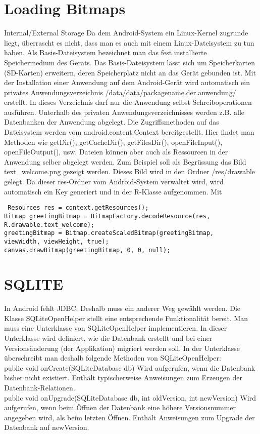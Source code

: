\documentclass[a4paper,10pt,titlepage=false]{scrreprt}
\begin{document}
\section{Loading Bitmaps}
Internal/External Storage
Da dem Android-System ein Linux-Kernel zugrunde liegt, überrascht es nicht, dass man es auch mit
einem Linux-Dateisystem zu tun haben. Als Basis-Dateisystem bezeichnet man das fest installierte
Speichermedium des Geräts. Das Basis-Dateisystem lässt sich um Speicherkarten (SD-Karten)
erweitern, deren Speicherplatz nicht an das Gerät gebunden ist.
Mit der Installation einer Anwendung auf dem Android-Gerät wird automatisch ein privates
Anwendungsverzeichnis
/data/data/packagename.der.anwendung/
erstellt. In dieses Verzeichnis darf nur die Anwendung selbst Schreiboperationen ausführen.
Unterhalb des privaten Anwendungsverzeichnisses werden z.B. alle Datenbanken der Anwendung
abgelegt.
Die Zugriffsmethoden auf das Dateisystem werden vom android.content.Context
bereitgestellt. Hier findet man Methoden wie getDir(), getCacheDir(), getFilesDir(),
openFileInput(), openFileOutput(), usw.
Dateien können aber auch als Ressourcen in der Anwendung selber abgelegt werden.
Zum Beispiel soll als Begrüssung das Bild text\_welcome.png gezeigt werden. Dieses Bild wird in
den Ordner /res/drawable gelegt. Da dieser res-Ordner vom Android-System verwaltet wird, wird
automatisch ein Key generiert und in der R-Klasse aufgenommen. Mit
\begin{lstlisting}
 Resources res = context.getResources();
Bitmap greetingBitmap = BitmapFactory.decodeResource(res, R.drawable.text_welcome);
greetingBitmap = Bitmap.createScaledBitmap(greetingBitmap,
viewWidth, viewHeight, true);
canvas.drawBitmap(greetingBitmap, 0, 0, null);
\end{lstlisting}
\section{SQLITE}
In Android fehlt JDBC. Deshalb muss ein anderer Weg gewählt werden. Die Klasse
SQLiteOpenHelper stellt eine entsprechende Funktionalität bereit. Man muss eine Unterklasse
von SQLiteOpenHelper implementieren. In dieser Unterklasse wird definiert, wie die Datenbank
erstellt und bei einer Versionsänderung (der Applikation) migriert werden soll. In der Unterklasse
überschreibt man deshalb folgende Methoden von SQLiteOpenHelper:
\\
public void onCreate(SQLiteDatabase db)
Wird aufgerufen, wenn die Datenbank bisher nicht existiert. Enthält typischerweise Anweisungen
zum Erzeugen der Datenbank-Relationen.
\\
public void onUpgrade(SQLiteDatabase db, int oldVersion, int newVersion)
Wird aufgerufen, wenn beim Öffnen der Datenbank eine höhere Versionsnummer angegeben
wird, als beim letzten Öffnen. Enthält Anweisungen zum Upgrade der Datenbank auf
newVersion.
\end{document}
